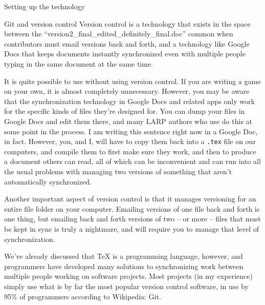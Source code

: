 \documentclass[sheet]{GameTexBase}
\begin{document}
\begin{section}{Setting up the technology}
\begin{subsection}{Git and version control}
Version control is a technology that exists in the space between the ``version2\_final\_edited\_definitely\_final.doc'' common when contributors must email versions back and forth, and a technology like Google Docs that keeps documents instantly synchronized even with multiple people typing in the same document at the same time.

It is quite possible to use \gametex{} without using version control.  If you are writing a game on your own, it is almost completely unnecessary.  However, you may be aware that the synchronization technology in Google Docs and related apps only work for the specific kinds of files they're designed for.  You can dump your \gametex{} files in Google Docs and edit them there, and many LARP authors who use \gametex{} do this at some point in the process.  I am writing this sentence right now in a Google Doc, in fact.  However, you, and I, will have to copy them back into a \texttt{.tex} file on our computers, and compile them to first make sure they work, and then to produce a document others can read, all of which can be inconvenient and can run into all the usual problems with managing two versions of something that aren't automatically synchronized.

Another important aspect of version control is that it manages versioning for an entire file folder on your computer.  Emailing versions of one file back and forth is one thing, but emailing back and forth versions of two -- or more -- files that must be kept in sync is truly a nightmare, and \gametex{} will require you to manage that level of synchronization.

We've already discussed that \TeX{} is a programming language, however, and programmers have developed many solutions to synchronizing work between multiple people working on software projects.  Most \gametex{} projects (in my experience) simply use what is by far the most popular version control software, in use by 95\% of programmers according to Wikipedia: Git.


\end{subsection}
\end{section}
\end{document}

